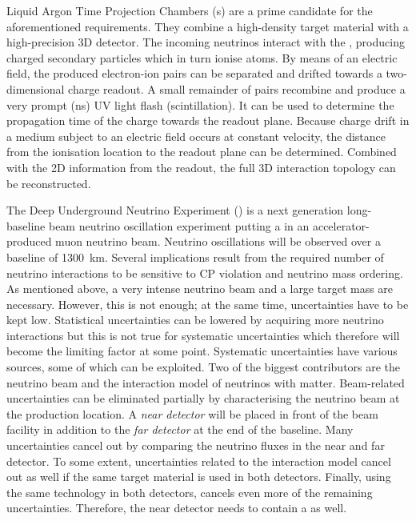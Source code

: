 Liquid Argon Time Projection Chambers (\lartpc{}s) are a prime candidate for the aforementioned requirements.
They combine a high-density target material with a high-precision 3D detector.
The incoming neutrinos interact with the \lar{}, producing charged secondary particles which in turn ionise  atoms.
By means of an electric field, the produced electron-ion pairs can be separated and drifted towards a two-dimensional charge readout.
A small remainder of pairs recombine and produce a very prompt (\si{\nano\second}) UV light flash (scintillation).
It can be used to determine the propagation time of the charge towards the readout plane.
Because charge drift in a medium subject to an electric field occurs at constant velocity, the distance from the ionisation location to the readout plane can be determined.
Combined with the 2D information from the readout, the full 3D interaction topology can be reconstructed.

The Deep Underground Neutrino Experiment (\dune{}) is a next generation long-baseline beam neutrino oscillation experiment putting a \lartpc{} in an accelerator-produced muon neutrino beam.
Neutrino oscillations will be observed over a baseline of \SI{1300}{\kilo\metre}.
Several implications result from the required number of neutrino interactions to be sensitive to CP violation and neutrino mass ordering.
As mentioned above, a very intense neutrino beam and a large target mass are necessary.
However, this is not enough; at the same time, uncertainties have to be kept low.
Statistical uncertainties can be lowered by acquiring more neutrino interactions but this is not true for systematic uncertainties which therefore will become the limiting factor at some point.
Systematic uncertainties have various sources, some of which can be exploited.
Two of the biggest contributors are the neutrino beam and the interaction model of neutrinos with matter.
Beam-related uncertainties can be eliminated partially by characterising the neutrino beam at the production location.
A \emph{near detector} will be placed in front of the beam facility in addition to the \emph{far detector} at the end of the baseline.
Many uncertainties cancel out by comparing the neutrino fluxes in the near and far detector.
To some extent, uncertainties related to the interaction model cancel out as well if the same target material is used in both detectors.
Finally, using the same technology in both detectors, cancels even more of the remaining uncertainties.
Therefore, the near detector needs to contain a \lartpc{} as well.

